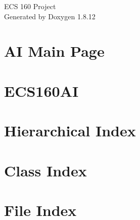 \documentclass[twoside]{book}
\newcommand{\+}{\discretionary{\mbox{\scriptsize$\hookleftarrow$}}{}{}}
\newcommand{\clearemptydoublepage}{%
  \newpage{\pagestyle{empty}\cleardoublepage}%
}
\begin{document}
\hypersetup{pageanchor=false,
             bookmarksnumbered=true,
             pdfencoding=unicode
            }
\begin{titlepage}
\vspace*{7cm}
\begin{center}%
{\Large E\+CS 160 Project }\\
\vspace*{1cm}
{\large Generated by Doxygen 1.8.12}\\
\end{center}
\end{titlepage}
\clearemptydoublepage
{}
\tableofcontents
\clearemptydoublepage
{}
\hypersetup{pageanchor=true}

\chapter{AI Main Page}
\label{index}\hypertarget{index}{}
\chapter{E\+C\+S160\+AI}
\label{md_README}
\hypertarget{md_README}{}

\chapter{Hierarchical Index}

\chapter{Class Index}

\chapter{File Index}

\end{document}
